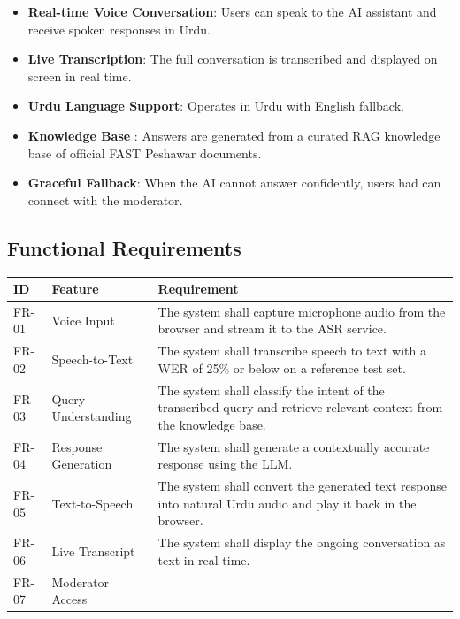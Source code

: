 \documentclass[12pt,a4paper]{report}
\begin{document}
\begin{itemize}
  \item \textbf{Real-time Voice Conversation}: 
        Users can speak to the AI
        assistant and receive spoken responses in Urdu.
  \item \textbf{Live Transcription}:
        The full conversation is transcribed and displayed on screen in real time.
  \item \textbf{Urdu Language Support}:
        Operates in Urdu with English fallback.
  \item \textbf{Knowledge Base }: 
        Answers are generated from a curated RAG knowledge base of official FAST Peshawar documents.
  \item \textbf{Graceful Fallback}:
        When the AI cannot answer confidently, users had can connect with the moderator.
\end{itemize}

\subsection{Functional Requirements}

\begin{longtable}{p{2cm} p{4cm} p{8.5cm}}
  \toprule
  \textbf{ID} & \textbf{Feature}         & \textbf{Requirement} \\
  \midrule
  \endhead
  FR-01 & Voice Input           & The system shall capture microphone audio from the browser and stream it to the ASR service. \\[4pt]
  FR-02 & Speech-to-Text        & The system shall transcribe speech to text with a WER of 25\% or below on a reference test set. \\[4pt]
  FR-03 & Query Understanding   & The system shall classify the intent of the transcribed query and retrieve relevant context from the knowledge base. \\[4pt]
  FR-04 & Response Generation   & The system shall generate a contextually accurate response using the LLM. \\[4pt]
  FR-05 & Text-to-Speech        & The system shall convert the generated text response into natural Urdu audio and play it back in the browser. \\[4pt]
  FR-06 & Live Transcript       & The system shall display the ongoing conversation as text in real time. \\[4pt]
  FR-07 & Moderator Access      &  \\[4pt]
  \bottomrule
\end{longtable}
\end{document}
